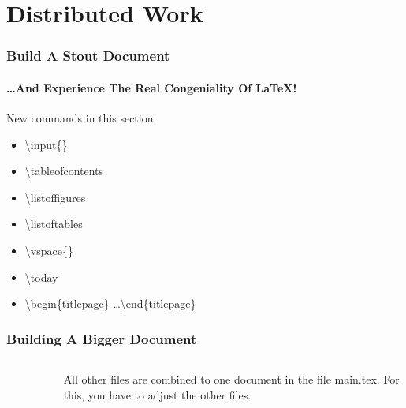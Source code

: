 \section{Distributed Work}
\begin{frame}
\frametitle{Build A Stout Document}
\framesubtitle{\ldots And Experience The Real Congeniality Of \LaTeX !}
\begin{block}{New commands in this section}
\begin{itemize}
  \item \color{nounibaredI}\textbackslash input\color{black}\{\}
  \item \color{nounibaredI}\textbackslash tableofcontents\color{black}
  \item \color{nounibaredI}\textbackslash listoffigures\color{black}
  \item \color{nounibaredI}\textbackslash listoftables\color{black}
  \item \color{nounibaredI}\textbackslash vspace\color{black}\{\}
  \item \color{nounibaredI}\textbackslash today\color{black}
\item \color{unibablueI}\textbackslash begin\color{black}\{titlepage\} \ldots \color{unibablueI}\textbackslash end\color{black}\{titlepage\} 
\end{itemize}
\end{block}
\end{frame}

\begin{frame}
\frametitle{Building A Bigger Document}

\begin{columns}
\begin{column}{.5\textwidth}
\footnotesize
\begin{figure}[t]
\end{figure}
\end{column}
\begin{column}{.5\textwidth}
All other files are combined to one document in the file main.tex. 
For this, you have to adjust the other files.
\end{column}
\end{columns}
\end{frame}

